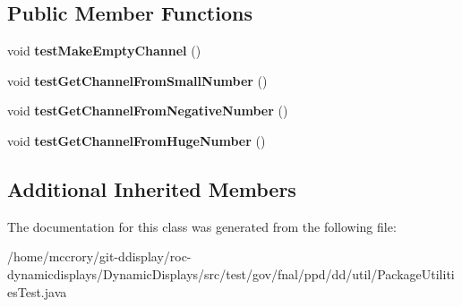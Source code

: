 \subsection*{Public Member Functions}
\begin{DoxyCompactItemize}
\item 
\hypertarget{classtest_1_1gov_1_1fnal_1_1ppd_1_1dd_1_1util_1_1PackageUtilitiesTest_a755280fe3851f23490b80ec8936b12a2}{void {\bfseries test\-Make\-Empty\-Channel} ()}\label{classtest_1_1gov_1_1fnal_1_1ppd_1_1dd_1_1util_1_1PackageUtilitiesTest_a755280fe3851f23490b80ec8936b12a2}

\item 
\hypertarget{classtest_1_1gov_1_1fnal_1_1ppd_1_1dd_1_1util_1_1PackageUtilitiesTest_aa3d66045fdebf7b9eef0171386f312e9}{void {\bfseries test\-Get\-Channel\-From\-Small\-Number} ()}\label{classtest_1_1gov_1_1fnal_1_1ppd_1_1dd_1_1util_1_1PackageUtilitiesTest_aa3d66045fdebf7b9eef0171386f312e9}

\item 
\hypertarget{classtest_1_1gov_1_1fnal_1_1ppd_1_1dd_1_1util_1_1PackageUtilitiesTest_a70e14161583dd037412d976ee5051106}{void {\bfseries test\-Get\-Channel\-From\-Negative\-Number} ()}\label{classtest_1_1gov_1_1fnal_1_1ppd_1_1dd_1_1util_1_1PackageUtilitiesTest_a70e14161583dd037412d976ee5051106}

\item 
\hypertarget{classtest_1_1gov_1_1fnal_1_1ppd_1_1dd_1_1util_1_1PackageUtilitiesTest_a3b735176b1ea2e34db01434033776b21}{void {\bfseries test\-Get\-Channel\-From\-Huge\-Number} ()}\label{classtest_1_1gov_1_1fnal_1_1ppd_1_1dd_1_1util_1_1PackageUtilitiesTest_a3b735176b1ea2e34db01434033776b21}

\end{DoxyCompactItemize}
\subsection*{Additional Inherited Members}


The documentation for this class was generated from the following file\-:\begin{DoxyCompactItemize}
\item 
/home/mccrory/git-\/ddisplay/roc-\/dynamicdisplays/\-Dynamic\-Displays/src/test/gov/fnal/ppd/dd/util/Package\-Utilities\-Test.\-java\end{DoxyCompactItemize}

